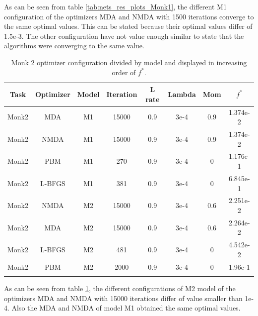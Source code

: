 As can be seen from table \ref{tab:nets_res_plots_Monk1}, the different M1 configuration of the optimizers MDA and NMDA with 1500 iterations converge to the same optimal values. This can be stated because their optimal values differ of 1.5e-3. The other configuration have not value enough similar to state that the algorithms were converging to the same value.


\begin{longtable}{|c|c|c|c|c|c|c|c|}
	\hline
	\centering
	\textbf{Task}&\textbf{Optimizer}&\textbf{Model} &\textbf{Iteration} & \textbf{L rate} & \multicolumn{1}{l|}{\textbf{Lambda}} & \textbf{Mom} & \textbf{$f^{*}$} \\ \hline 
	Monk2 & MDA & M1 & 15000 & 0.9 & 3e-4  & 0.9 & 1.374e-2 		\\
	Monk2 & NMDA & M1 & 15000 & 0.9 & 3e-4  & 0.9 &  1.374e-2 	\\
	Monk2 & PBM & M1 & 270 & 0.9 & 3e-4  & 0 & 1.176e-1  				\\
	Monk2 & L-BFGS & M1 & 381 & 0.9 & 3e-4  & 0 & 6.845e-1 			\\
	Monk2 & NMDA & M2 & 15000 & 0.9 & 3e-4  & 0.6 & 2.251e-2 	\\
	Monk2 & MDA & M2 & 15000 & 0.9 & 3e-4  & 0.6 & 2.264e-2 		\\
	Monk2 & L-BFGS & M2 & 481 & 0.9 & 3e-4  & 0 & 4.542e-2 			\\
	Monk2 & PBM & M2 & 2000 & 0.9 & 3e-4  & 0 & 1.96e-1 				\\
	\hline
	\caption{Monk 2 optimizer configuration divided by model and displayed in increasing order of $f^*$.}
	\label{tab:nets_res_plots_Monk2}
\end{longtable}

As can be seen from table \ref{tab:nets_res_plots_Monk2}, the different configurations of M2 model of the optimizers MDA and NMDA with 15000 iterations differ of value smaller than 1e-4. Also the MDA and NMDA of model M1 obtained the same optimal values.


